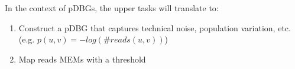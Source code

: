 In the context of pDBGs, the upper tasks will translate to:
\begin{enumerate}
	\item Construct a pDBG that captures technical noise, population variation, etc. (e.g. $p(u,v) = -log(\#reads(u,v))$)
	\item Map reads MEMs with a threshold 
\end{enumerate}





